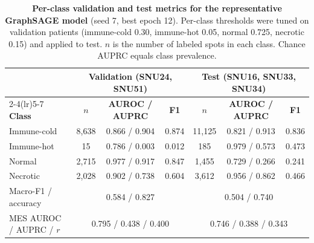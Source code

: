 \documentclass[11pt,letterpaper]{article}
\begin{document}
\begin{table}[H]
\centering
\caption{\textbf{Per-class validation and test metrics for the representative GraphSAGE model} (seed 7, best epoch 12). Per-class thresholds were tuned on validation patients (immune-cold 0.30, immune-hot 0.05, normal 0.725, necrotic 0.15) and applied to test. $n$ is the number of labeled spots in each class. Chance AUPRC equals class prevalence.}
\label{tab:s7}
\small
\begin{tabular}{lcccccc}
\toprule
 & \multicolumn{3}{c}{\textbf{Validation (SNU24, SNU51)}} & \multicolumn{3}{c}{\textbf{Test (SNU16, SNU33, SNU34)}} \\
\cmidrule(lr){2-4}\cmidrule(lr){5-7}
\textbf{Class} & $n$ & \textbf{AUROC / AUPRC} & \textbf{F1} & $n$ & \textbf{AUROC / AUPRC} & \textbf{F1} \\
\midrule
Immune-cold & 8{,}638 & 0.866 / 0.904 & 0.874 & 11{,}125 & 0.821 / 0.913 & 0.836 \\
Immune-hot  & 15      & 0.786 / 0.003 & 0.012 & 185     & 0.979 / 0.573 & 0.473 \\
Normal      & 2{,}715 & 0.977 / 0.917 & 0.847 & 1{,}455 & 0.729 / 0.266 & 0.241 \\
Necrotic    & 2{,}028 & 0.902 / 0.738 & 0.604 & 3{,}612 & 0.956 / 0.862 & 0.466 \\
\midrule
Macro-F1 / accuracy & \multicolumn{3}{c}{0.584 / 0.827} & \multicolumn{3}{c}{0.504 / 0.740} \\
MES AUROC / AUPRC / $r$ & \multicolumn{3}{c}{0.795 / 0.438 / 0.400} & \multicolumn{3}{c}{0.746 / 0.388 / 0.343} \\
\bottomrule
\end{tabular}
\end{table}

\vspace{1.5em}
\end{document}
